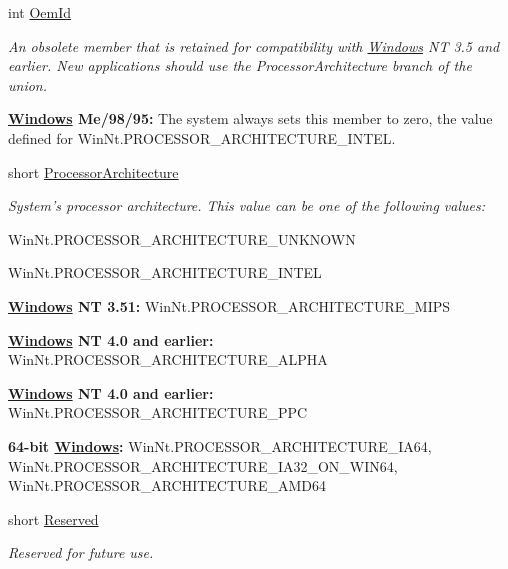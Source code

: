 \begin{DoxyCompactItemize}
\item 
int \hyperlink{struct_tao_1_1_platform_1_1_windows_1_1_kernel_1_1_s_y_s_t_e_m___i_n_f_o___u_n_i_o_n_afdbd9f4c92a56503a9b8fd4f0843c84a}{OemId}
\begin{DoxyCompactList}\small\item\em An obsolete member that is retained for compatibility with \hyperlink{namespace_tao_1_1_platform_1_1_windows}{Windows} NT 3.5 and earlier. New applications should use the {\itshape ProcessorArchitecture\/} branch of the union. 

{\bfseries \hyperlink{namespace_tao_1_1_platform_1_1_windows}{Windows} Me/98/95:} The system always sets this member to zero, the value defined for WinNt.PROCESSOR\_\-ARCHITECTURE\_\-INTEL. \item\end{DoxyCompactList}\item 
short \hyperlink{struct_tao_1_1_platform_1_1_windows_1_1_kernel_1_1_s_y_s_t_e_m___i_n_f_o___u_n_i_o_n_ab03cf53885bba407280234cb6e5059bb}{ProcessorArchitecture}
\begin{DoxyCompactList}\small\item\em System's processor architecture. This value can be one of the following values: 

WinNt.PROCESSOR\_\-ARCHITECTURE\_\-UNKNOWN 

WinNt.PROCESSOR\_\-ARCHITECTURE\_\-INTEL 

{\bfseries \hyperlink{namespace_tao_1_1_platform_1_1_windows}{Windows} NT 3.51:} WinNt.PROCESSOR\_\-ARCHITECTURE\_\-MIPS 

{\bfseries \hyperlink{namespace_tao_1_1_platform_1_1_windows}{Windows} NT 4.0 and earlier:} WinNt.PROCESSOR\_\-ARCHITECTURE\_\-ALPHA 

{\bfseries \hyperlink{namespace_tao_1_1_platform_1_1_windows}{Windows} NT 4.0 and earlier:} WinNt.PROCESSOR\_\-ARCHITECTURE\_\-PPC 

{\bfseries 64-\/bit \hyperlink{namespace_tao_1_1_platform_1_1_windows}{Windows}:} WinNt.PROCESSOR\_\-ARCHITECTURE\_\-IA64, WinNt.PROCESSOR\_\-ARCHITECTURE\_\-IA32\_\-ON\_\-WIN64, WinNt.PROCESSOR\_\-ARCHITECTURE\_\-AMD64 \item\end{DoxyCompactList}\item 
short \hyperlink{struct_tao_1_1_platform_1_1_windows_1_1_kernel_1_1_s_y_s_t_e_m___i_n_f_o___u_n_i_o_n_adfb1716ec09e2b0ceb6edf6e32d8a2fc}{Reserved}
\begin{DoxyCompactList}\small\item\em Reserved for future use. \item\end{DoxyCompactList}\end{DoxyCompactItemize}


